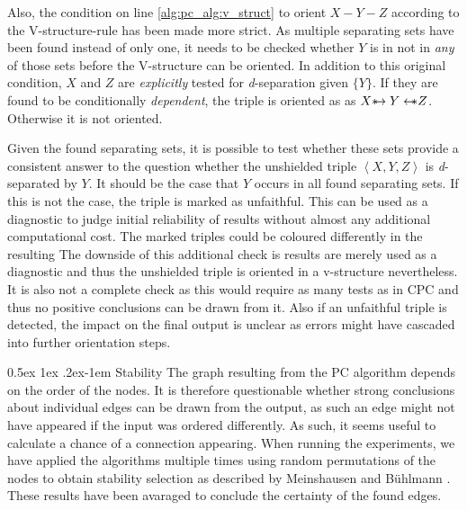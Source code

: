 \documentclass[a4paper, 10pt, english, onecolumn]{article}
\makeatletter
\def \srightarrow {\text{\textasteriskcentered}\hspace{-0.62em}\rightarrow}
\def \sleftarrow {\leftarrow\hspace{-0.62em}\text{\textasteriskcentered}}
\renewcommand{\paragraph}{%
  \@startsection{paragraph}{4}%
  {\z@}{0.5ex \@plus 1ex \@minus .2ex}{-1em}%
  {\normalfont\normalsize\bfseries}%
}
\makeatother
\begin{document}
Also, the condition on line \ref{alg:pc_alg:v_struct} to orient $X - Y - Z$ according to the V-structure-rule has been made more strict.
As multiple separating sets have been found instead of only one, it needs to be checked whether $Y$ is in not in \emph{any} of those sets before the V-structure can be oriented.
In addition to this original condition, $X$ and $Z$ are \textit{explicitly} tested for \textit{d}-separation given $\{Y\}$.
If they are found to be conditionally \textit{dependent}, the triple is oriented as as $X \srightarrow Y \sleftarrow Z$.
Otherwise it is not oriented.

Given the found separating sets, it is possible to test whether these sets provide a consistent answer to the question whether the unshielded triple $\left<X,Y,Z\right>$ is \textit{d}-separated by $Y$.
It should be the case that $Y$ occurs in all found separating sets.
If this is not the case, the triple is marked as unfaithful.
This can be used as a diagnostic to judge initial reliability of results without almost any additional computational cost.
The marked triples could be coloured differently in the resulting 
The downside of this additional check is results are merely used as a diagnostic and thus the unshielded triple is oriented in a v-structure nevertheless.
It is also not a complete check as this would require as many tests as in CPC and thus no positive conclusions can be drawn from it.
Also if an unfaithful triple is detected, the impact on the final output is unclear as errors might have cascaded into further orientation steps.

\paragraph{Stability}
The graph resulting from the PC algorithm depends on the order of the nodes\cite[p.120-122]{spirtes2000}.
It is therefore questionable whether strong conclusions about individual edges can be drawn from the output, as such an edge might not have appeared if the input was ordered differently.
As such, it seems useful to calculate a chance of a connection appearing.
When running the experiments, we have applied the algorithms multiple times using random permutations of the nodes to obtain stability selection as described by Meinshausen and B{\"u}hlmann \cite{meinshausen2010}.
These results have been avaraged to conclude the certainty of the found edges.
\end{document}
